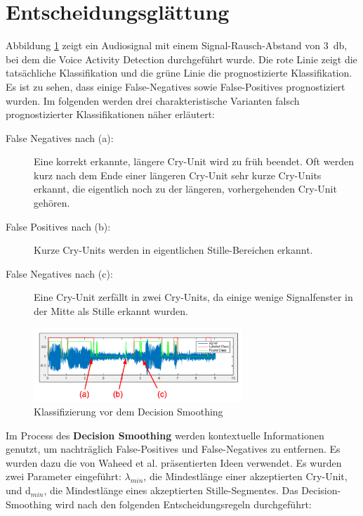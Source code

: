 \section{Entscheidungsglättung}
\label{sec:decision_smoothing_new}

Abbildung \ref{img:beforeSmoothing} zeigt ein Audiosignal mit einem Signal-Rausch-Abstand von \SI{3}{\decibel}, bei dem die Voice Activity Detection durchgeführt wurde. Die rote Linie zeigt die tatsächliche Klassifikation und die grüne Linie die prognostizierte Klassifikation. Es ist zu sehen, dass einige False-Negatives sowie False-Positives prognostiziert wurden. Im folgenden werden drei charakteristische Varianten falsch prognostizierter Klassifikationen näher erläutert:

\begin{description}
	\item [False Negatives nach (a): ] Eine korrekt erkannte, längere Cry-Unit wird zu früh beendet. Oft werden kurz nach dem Ende einer längeren Cry-Unit sehr kurze Cry-Units erkannt, die eigentlich noch zu der längeren, vorhergehenden Cry-Unit gehören.
	\item [False Positives nach (b): ] Kurze Cry-Units werden in eigentlichen Stille-Bereichen erkannt.
	\item [False Negatives nach (c): ] Eine Cry-Unit zerfällt in zwei Cry-Units, da einige wenige Signalfenster in der Mitte als Stille erkannt wurden.
\end{description}

\begin{figure}[h]
	\centering
	\includegraphics[width=0.7\textwidth]{bilder/smoothing02.png}
	\caption{Klassifizierung vor dem Decision Smoothing}
	\label{img:beforeSmoothing}
\end{figure}

Im Process des \textbf{Decision Smoothing} werden kontextuelle Informationen genutzt, um nachträglich False-Positives und False-Negatives zu entfernen. Es wurden dazu die von Waheed et al. \cite{vad_entropy} präsentierten Ideen verwendet. Es wurden zwei Parameter eingeführt: $\lambda_{min}$, die Mindestlänge einer akzeptierten Cry-Unit, und d$_{min}$, die Mindestlänge eines akzeptierten Stille-Segmentes. Das Decision-Smoothing wird nach den folgenden Entscheidungsregeln durchgeführt:

